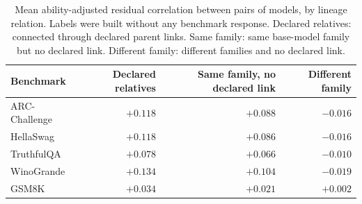 \begin{table}[!htb]\centering\small
\caption{Mean ability-adjusted residual correlation between pairs of models, by lineage relation. Labels were built without any benchmark response. Declared relatives: connected through declared parent links. Same family: same base-model family but no declared link. Different family: different families and no declared link.}\label{tab:validation}
\begin{tabular}{lrrr}
\toprule
Benchmark & Declared relatives & Same family, no declared link & Different family\\
\midrule
ARC-Challenge & $+0.118$ & $+0.088$ & $-0.016$\\
HellaSwag & $+0.118$ & $+0.086$ & $-0.016$\\
TruthfulQA & $+0.078$ & $+0.066$ & $-0.010$\\
WinoGrande & $+0.134$ & $+0.104$ & $-0.019$\\
GSM8K & $+0.034$ & $+0.021$ & $+0.002$\\
\bottomrule
\end{tabular}
\end{table}
